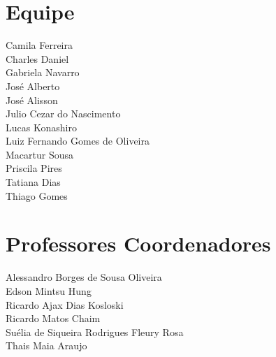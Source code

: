 \begin{center}

\chapter*{Equipe}

Camila Ferreira \\
Charles Daniel \\
Gabriela Navarro \\
José Alberto \\
José Alisson \\
Julio Cezar do Nascimento \\
Lucas Konashiro \\
Luiz Fernando Gomes de Oliveira \\
Macartur Sousa \\
Priscila Pires \\
Tatiana Dias \\
Thiago Gomes

\vspace{3cm}

\let\clearpage\relax
\chapter*{Professores Coordenadores}

Alessandro Borges de Sousa Oliveira \\
Edson Mintsu Hung \\
Ricardo Ajax Dias Kosloski \\
Ricardo Matos Chaim  \\
Suélia de Siqueira Rodrigues Fleury Rosa \\
Thais Maia Araujo \\

\end{center}

\newpage
